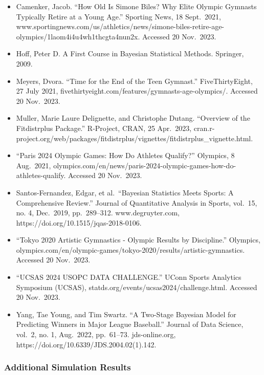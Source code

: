 \documentclass[
  letterpaper,
  DIV=11,
  numbers=noendperiod]{scrartcl}
\begin{document}
\begin{itemize}
\item
  Camenker, Jacob. ``How Old Is Simone Biles? Why Elite Olympic Gymnasts
  Typically Retire at a Young Age.'' Sporting News, 18 Sept.~2021,
  www.sportingnews.com/us/athletics/news/simone-biles-retire-age-olympics/1laom4i4u4wh1thcgta4nun2x.
  Accessed 20 Nov.~2023.
\item
  Hoff, Peter D. A First Course in Bayesian Statistical Methods.
  Springer, 2009.
\item
  Meyers, Dvora. ``Time for the End of the Teen Gymnast.''
  FiveThirtyEight, 27 July 2021,
  fivethirtyeight.com/features/gymnasts-age-olympics/. Accessed 20
  Nov.~2023.
\item
  Muller, Marie Laure Delignette, and Christophe Dutang. ``Overview of
  the Fitdistrplus Package.'' R-Project, CRAN, 25 Apr.~2023,
  cran.r-project.org/web/packages/fitdistrplus/vignettes/fitdistrplus\_vignette.html.
\item
  ``Paris 2024 Olympic Games: How Do Athletes Qualify?'' Olympics, 8
  Aug.~2021,
  olympics.com/en/news/paris-2024-olympic-games-how-do-athletes-qualify.
  Accessed 20 Nov.~2023.
\item
  Santos-Fernandez, Edgar, et al.~``Bayesian Statistics Meets Sports: A
  Comprehensive Review.'' Journal of Quantitative Analysis in Sports,
  vol.~15, no. 4, Dec.~2019, pp.~289--312. www.degruyter.com,
  https://doi.org/10.1515/jqas-2018-0106.
\item
  ``Tokyo 2020 Artistic Gymnastics - Olympic Results by Discipline.''
  Olympics,
  olympics.com/en/olympic-games/tokyo-2020/results/artistic-gymnastics.
  Accessed 20 Nov.~2023.
\item
  ``UCSAS 2024 USOPC DATA CHALLENGE.'' UConn Sports Analytics Symposium
  (UCSAS), statds.org/events/ucsas2024/challenge.html. Accessed 20
  Nov.~2023.
\item
  Yang, Tae Young, and Tim Swartz. ``A Two-Stage Bayesian Model for
  Predicting Winners in Major League Baseball.'' Journal of Data
  Science, vol.~2, no. 1, Aug.~2022, pp.~61--73. jds-online.org,
  https://doi.org/10.6339/JDS.2004.02(1).142.
\end{itemize}

\hypertarget{additional-simulation-results}{%
\subsubsection{Additional Simulation
Results}\label{additional-simulation-results}}
\end{document}
